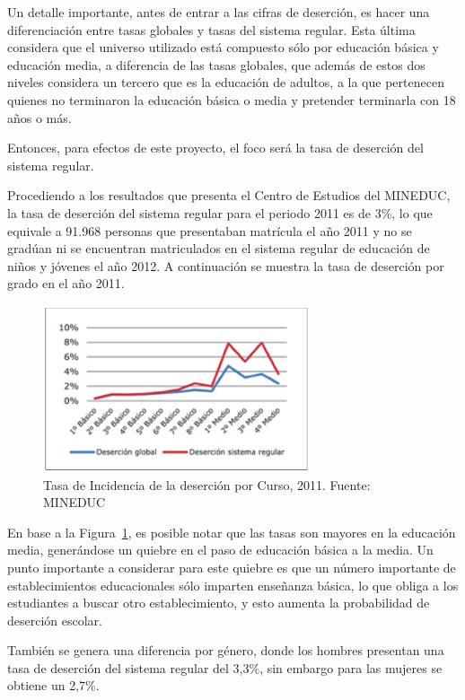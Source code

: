 Un detalle importante, antes de entrar a las cifras de deserción, es hacer una diferenciación entre tasas globales y tasas del sistema regular. Esta última considera que el universo utilizado está compuesto sólo por educación básica y educación media, a diferencia de las tasas globales, que además de estos dos niveles considera un tercero que es la educación de adultos, a la que pertenecen quienes no terminaron la educación básica o media y pretender terminarla con 18 años o más. 

Entonces, para efectos de este proyecto, el foco será la tasa de deserción del sistema regular. 

Procediendo a los resultados que presenta el Centro de Estudios del MINEDUC, la tasa de deserción del sistema regular para el periodo 2011 es de 3\%, lo que equivale a 91.968 personas que presentaban matrícula el año 2011 y no se gradúan ni se encuentran matriculados en el sistema regular de educación de niños y jóvenes el año 2012. A continuación se muestra la tasa de deserción por grado en el año 2011. 

\begin{figure}[H]
  \centering
    \includegraphics[width=0.7\textwidth]{Figuras/desercioncurso}
      \caption{Tasa de Incidencia de la deserción por Curso, 2011. Fuente: MINEDUC}
    \label{fig:curso}
\end{figure}

En base a la Figura~\ref{fig:curso}, es posible notar que las tasas son mayores en la educación media, generándose un quiebre en el paso de educación básica a la media. Un punto importante a considerar para este quiebre es que un número importante de establecimientos educacionales sólo imparten enseñanza básica, lo que obliga a los estudiantes a buscar otro establecimiento, y esto aumenta la probabilidad de deserción escolar. 

También se genera una diferencia por género, donde los hombres presentan una tasa de deserción del sistema regular del 3,3\%, sin embargo para las mujeres se obtiene un 2,7\%.

